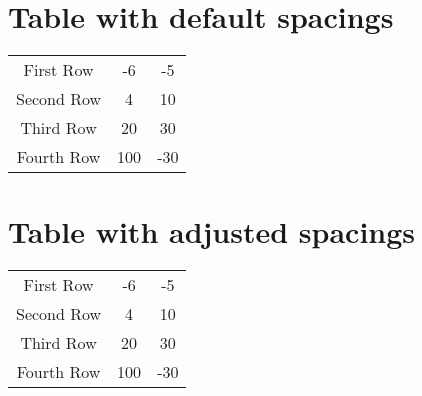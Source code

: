 \documentclass{article}
\begin{document}
\section*{Table with default spacings}

\begin{tabular}{ c c c }
First Row & -6 & -5 \\
Second Row & 4 & 10\\
Third Row & 20 & 30\\
Fourth Row & 100 & -30\\
\end{tabular}

\section*{Table with adjusted spacings}

\begingroup
\setlength{\tabcolsep}{10pt} %
\renewcommand{\arraystretch}{1.5} %
\begin{tabular}{ c c c }
First Row & -6 & -5 \\
Second Row & 4 & 10\\
Third Row & 20 & 30\\
Fourth Row & 100 & -30\\
\end{tabular}
\endgroup
\end{document}
